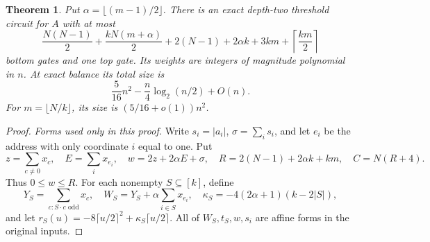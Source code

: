 \documentclass[11pt,letterpaper]{article}
\newtheorem{theorem}{Theorem}
\theoremstyle{remark}
\begin{document}
\begin{theorem}\label{thm:exact}
Put $\alpha=\lfloor(m-1)/2\rfloor$. There is an exact depth-two threshold
circuit for $A$ with at most
\begin{equation}\label{eq:bestcount}
\frac{N(N-1)}2+\frac{kN(m+\alpha)}2
 +2(N-1)+2\alpha k+3km+\left\lceil\frac{km}{2}\right\rceil
\end{equation}
bottom gates and one top gate. Its weights are integers of magnitude
polynomial in $n$. At exact balance its total size is
\[
\frac5{16}n^2-\frac n4\log_2(n/2)+O(n).
\]
For $m=\lfloor N/k\rfloor$, its size is $(5/16+o(1))n^2$.
\end{theorem}

\begin{proof}
\emph{Forms used only in this proof.}
Write $s_i=|a_i|$, $\sigma=\sum_i s_i$, and let $e_i$ be the address with
only coordinate $i$ equal to one. Put
\[
z=\sum_{c\ne0}x_c,\quad E=\sum_i x_{e_i},\quad
w=2z+2\alpha E+\sigma,\quad R=2(N-1)+2\alpha k+km,\quad C=N(R+4).
\]
Thus $0\le w\le R$. For each nonempty $S\subseteq[k]$, define
\[
Y_S=\sum_{c:S\cdot c\text{ odd}}x_c,\quad
W_S=Y_S+\alpha\sum_{i\in S}x_{e_i},\quad
\kappa_S=-4(2\alpha+1)(k-2|S|),
\]
and let $r_S(u)=-8\lceil u/2\rceil^2+\kappa_S\lceil u/2\rceil$.
All of $W_S,t_S,w,s_i$ are affine forms in the original inputs.


\end{proof}
\end{document}
